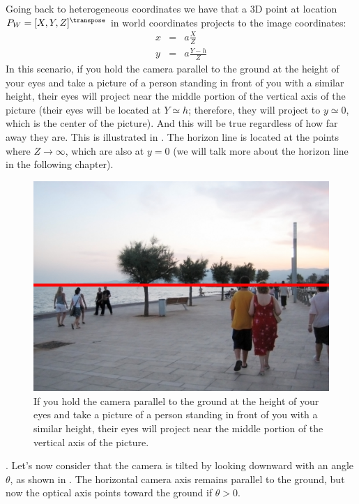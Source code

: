 Going back to heterogeneous coordinates we have that a 3D point at location $P_W=[X, Y, Z]^\transpose$ in world coordinates projects to the image coordinates:
\begin{eqnarray}
x &=& a \frac{X}{Z} \\
y &=& a \frac{Y-h}{Z} 
\end{eqnarray}
In this scenario, if you hold the camera parallel to the ground at the height of your eyes and take a picture of a person standing in front of you with a similar height, their eyes will project near the middle portion of the vertical axis of the picture (their eyes will be located at $Y\simeq h$; therefore, they will project to $y \simeq 0$, which is the center of the picture). And this will be true regardless of how far away they are. This is illustrated in \fig{\ref{fig:horizon_heads}}. The horizon line is located at the points where $Z \rightarrow \infty$, which are also at $y=0$ (we will talk more about the horizon line in the following chapter). 


\begin{figure}[t]
\centerline{
\includegraphics[width=.6\linewidth]{figures/imaging_geometry/horizon_heads.jpg}
}
\caption{If you hold the camera parallel to the ground at the height of your eyes and take a picture of a person standing in front of you with a similar height, their eyes will project near the middle portion of the vertical axis of the picture.}
\label{fig:horizon_heads}
\end{figure}

. Let's now consider that the camera is tilted by looking downward with an angle $\theta$, as shown in . The horizontal camera axis remains parallel to the ground, but now the optical axis points toward the ground if $\theta>0$. 


